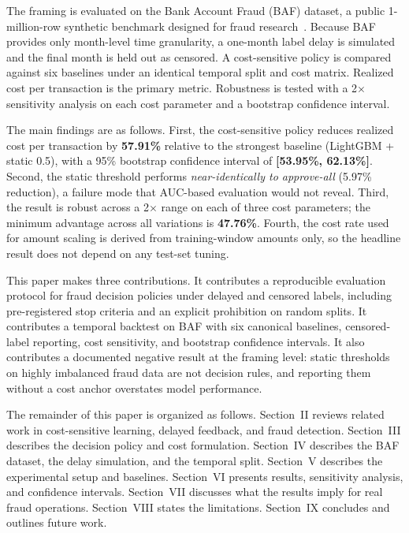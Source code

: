 \documentclass[conference]{IEEEtran}
\begin{document}
The framing is evaluated on the Bank Account Fraud (BAF) dataset, a
public 1-million-row synthetic benchmark designed for fraud
research~\cite{jesus2022}. Because BAF provides only month-level time
granularity, a one-month label delay is simulated and the final month is
held out as censored. A cost-sensitive policy is compared against six
baselines under an identical temporal split and cost matrix. Realized cost
per transaction is the primary metric. Robustness is tested with a
2$\times$ sensitivity analysis on each cost parameter and a bootstrap
confidence interval.

The main findings are as follows. First, the cost-sensitive policy reduces
realized cost per transaction by \textbf{57.91\%} relative to the strongest
baseline (LightGBM + static 0.5), with a 95\% bootstrap confidence interval
of \textbf{[53.95\%, 62.13\%]}. Second, the static threshold performs
\emph{near-identically to approve-all} (5.97\% reduction), a failure mode
that AUC-based evaluation would not reveal. Third, the result is robust
across a 2$\times$ range on each of three cost parameters; the minimum
advantage across all variations is \textbf{47.76\%}. Fourth, the cost rate
used for amount scaling is derived from training-window amounts only, so
the headline result does not depend on any test-set tuning.

This paper makes three contributions. It contributes a reproducible
evaluation protocol for fraud decision policies under delayed and censored
labels, including pre-registered stop criteria and an explicit prohibition
on random splits. It contributes a temporal backtest on BAF with six
canonical baselines, censored-label reporting, cost sensitivity, and
bootstrap confidence intervals. It also contributes a documented negative
result at the framing level: static thresholds on highly imbalanced fraud
data are not decision rules, and reporting them without a cost anchor
overstates model performance.

The remainder of this paper is organized as follows. Section~II reviews
related work in cost-sensitive learning, delayed feedback, and fraud
detection. Section~III describes the decision policy and cost formulation.
Section~IV describes the BAF dataset, the delay simulation, and the
temporal split. Section~V describes the experimental setup and baselines.
Section~VI presents results, sensitivity analysis, and confidence
intervals. Section~VII discusses what the results imply for real fraud
operations. Section~VIII states the limitations. Section~IX concludes and
outlines future work.
\end{document}
